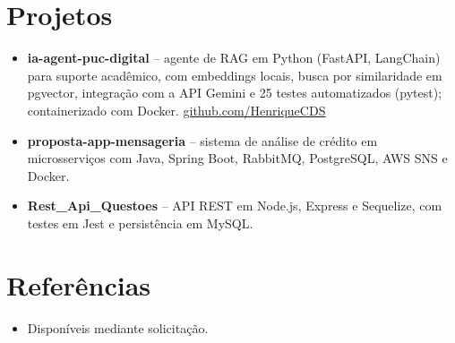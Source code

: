 \documentclass[11pt,a4paper,sans]{moderncv}
\begin{document}
\section{Projetos}
\vspace{1pt}
\begin{itemize}
\item \textbf{ia-agent-puc-digital} -- agente de RAG em Python (FastAPI, LangChain) para suporte acadêmico, com embeddings locais, busca por similaridade em pgvector, integração com a API Gemini e 25 testes automatizados (pytest); containerizado com Docker. \href{https://github.com/HenriqueCDS}{github.com/HenriqueCDS}
\item \textbf{proposta-app-mensageria} -- sistema de análise de crédito em microsserviços com Java, Spring Boot, RabbitMQ, PostgreSQL, AWS SNS e Docker.
\item \textbf{Rest\_Api\_Questoes} -- API REST em Node.js, Express e Sequelize, com testes em Jest e persistência em MySQL.
\end{itemize}


\section{Referências}
\vspace{1pt}
\begin{itemize}
\item{Disponíveis mediante solicitação.}
\end{itemize}
\end{document}
